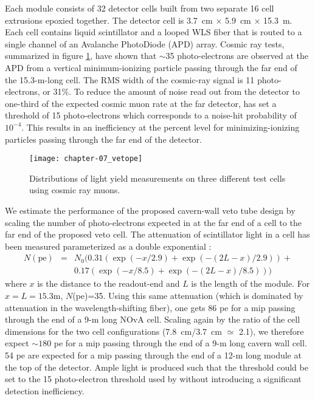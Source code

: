 Each \NOvA module consists of 32 detector cells built from two separate 16 cell extrusions epoxied together. The \NOvA detector cell is 3.7~cm $\times$ 5.9~cm $\times$ 15.3~m. Each cell contains liquid scintillator and a looped WLS fiber that is routed to a single channel of an Avalanche PhotoDiode (APD) array. Cosmic ray tests, summarized in figure \ref{fig:nova_pe}, have shown that $\sim$35 photo-electrons are observed at the APD from a vertical minimum-ionizing particle passing through the far end of the 15.3-m-long cell. The RMS width of the cosmic-ray signal is 11 photo-electrons, or 31\%. To reduce the amount of noise read out from the detector to one-third of the expected cosmic muon rate at the far detector, \NOvA has set a threshold of 15 photo-electrons which corresponds to a noise-hit probability of $10^{-4}$.  This results in an inefficiency at the percent level for minimizing-ionizing particles passing through the far end of the detector.

\begin{figure}[h]
\centering
\texttt{[image: chapter-07\_vetope]}
\caption{Distributions of light yield measurements on three different \NOvA test cells using cosmic ray muons. \cite{novatdr} }
\label{fig:nova_pe}
\end{figure}

We estimate the performance of the proposed cavern-wall veto tube design by scaling the number of photo-electrons expected in at the far end of a \NOvA cell to the far end of the proposed veto cell.  The attenuation of scintillator light in a \NOvA cell has been measured parameterized as a double exponential \cite{NOvA-docdb3290}:
\begin{eqnarray*}
N(\mathrm{pe}) & = & N_0( 0.31(\exp(-x/2.9) + \exp(-(2L-x)/2.9)) + \\
& & 0.17(\exp(-x/8.5)+\exp(-(2L-x)/8.5)))
\end{eqnarray*}
where $x$ is the distance to the readout-end and $L$ is the length of the module.  For $x=L=15.3$m, $N$(pe)=35.  Using this same attenuation (which is dominated by attenuation in the wavelength-shifting fiber), one gets 86 pe for a mip passing through the end of a 9-m long NOvA cell.  Scaling again by the ratio of the cell dimensions for the two cell configurations (7.8~cm/3.7~cm $\simeq$ 2.1), we therefore expect $\sim 180$ pe for a mip passing through the end of a 9-m long cavern wall cell.  54 pe are expected for a mip passing through the end of a 12-m long \NOvA module at the top of the detector.  Ample light is produced such that the threshold could be set to the 15 photo-electron threshold used by \NOvA without introducing a significant detection inefficiency.


